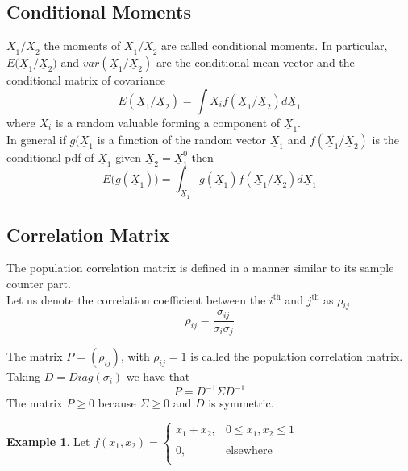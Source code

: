 \documentclass[11pt,a4paper]{article}
\theoremstyle{definition}
\newtheorem{exa}[thm]{Example}
\begin{document}
\subsection{Conditional Moments}
$\underline{X}_1/\underline{X}_2$ the moments of $\underline{X}_1/\underline{X}_2$ are called conditional moments. In particular, $E\big(\underline{X}_1/\underline{X}_2\big)$ and $var(\underline{X}_1/\underline{X}_2)$  are the conditional mean vector and the conditional matrix of covariance $$E(\underline{X}_1/\underline{X}_2) = \int X_i f(\underline{X}_1/\underline{X}_2)d\underline{X}_1$$
where $X_i$ is a random valuable forming a component of $\underline{X}_1$.\\

In general if $g(\underline{X}_1$ is a function of the random vector $\underline{X}_1$ and $f(\underline{X}_1/\underline{X}_2)$ is the conditional pdf of $\underline{X}_1$ given $\underline{X}_2= \underline{X}_1^0$ then 
$$E\big(g(\underline{X}_1)\big) = \int_{\underline{X}_1} g(\underline{X}_1) f(\underline{X}_1/\underline{X}_2) d\underline{X}_1$$







\subsection{Correlation Matrix}
The population correlation matrix is defined in a manner similar to its sample counter part.\\
Let us denote the correlation coefficient between the $i^{\text{th}}$ and $j^{\text{th}}$   as $\rho_{ij}$ $$\rho_{ij} = \frac{\sigma_{ij}}{\sigma_i\sigma_j}$$ 

The matrix $P = (\rho_{ij})$, with $\rho_{ij} = 1 $ is called the population correlation matrix.\\

Taking $D=Diag (\sigma_i)$ we have that $$P = D^{-1}\Sigma D^{-1}$$
The matrix $P\geq 0$ because $\Sigma\geq 0$ and $D$ is symmetric.\\



\begin{exa}

Let $f(x_1,x_2) = 
\begin{cases}
x_1 + x_2, & 0\leq x_1,x_2\leq 1\\\\
0, & \text{elsewhere}\\
\end{cases}
$\\
\end{exa}
\end{document}
